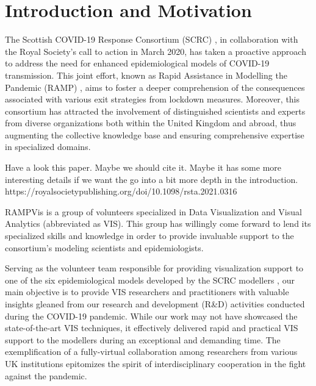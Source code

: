 \section{Introduction and Motivation}
\label{sec:intro}

The Scottish COVID-19 Response Consortium (SCRC) \cite{2020University}, in collaboration with the Royal Society's call to action in March 2020, has taken a proactive approach to address the need for enhanced epidemiological models of COVID-19 transmission.
This joint effort, known as Rapid Assistance in Modelling the Pandemic (RAMP) \cite{2020Rapid}, aims to foster a deeper comprehension of the consequences associated with various exit strategies from lockdown measures.
Moreover, this consortium has attracted the involvement of distinguished scientists and experts from diverse organizations both within the United Kingdom and abroad, thus augmenting the collective knowledge base and ensuring comprehensive expertise in specialized domains.

Have a look this paper.  Maybe we should cite it.  Maybe it has some more interesting details if we want the go into a bit more depth in the introduction.
https://royalsocietypublishing.org/doi/10.1098/rsta.2021.0316

RAMPVis \cite{2020Visualization} is a group of volunteers specialized in Data Visualization and Visual Analytics (abbreviated as VIS).
This group has willingly come forward to lend its specialized skills and knowledge in order to provide invaluable support to the consortium's modeling scientists and epidemiologists.

Serving as the volunteer team responsible for providing visualization support to one of the six epidemiological models developed by the SCRC modellers \cite{chen2022RAMPVIS}, our main objective is to provide VIS researchers and practitioners with valuable insights gleaned from our research and development (R\&D) activities conducted during the COVID-19 pandemic.
While our work may not have showcased the state-of-the-art VIS techniques, it effectively delivered rapid and practical VIS support to the modellers during an exceptional and demanding time.
The exemplification of a fully-virtual collaboration among researchers from various UK institutions epitomizes the spirit of interdisciplinary cooperation in the fight against the pandemic.


